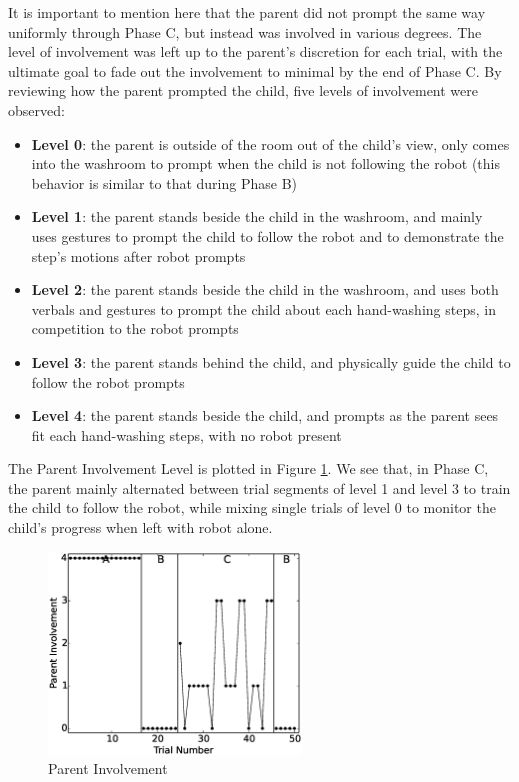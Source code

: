 \documentclass{ut-thesis}
\begin{document}
It is important to mention here that the parent did not prompt the same way uniformly through Phase C, but instead was involved in various degrees.  The level of involvement was left up to the parent's discretion for each trial, with the ultimate goal to fade out the involvement to minimal by the end of Phase C.  By reviewing how the parent prompted the child, five levels of involvement were observed:
\begin{itemize}
	\item \textbf{Level 0}: the parent is outside of the room out of the child's view, only comes into the washroom to prompt when the child is not following the robot (this behavior is similar to that during Phase B)
	\item \textbf{Level 1}: the parent stands beside the child in the washroom, and mainly uses gestures to prompt the child to follow the robot and to demonstrate the step's motions after robot prompts
	\item \textbf{Level 2}: the parent stands beside the child in the washroom, and uses both verbals and gestures to prompt the child about each hand-washing steps, in competition to the robot prompts
	\item \textbf{Level 3}: the parent stands behind the child, and physically guide the child to follow the robot prompts
	\item \textbf{Level 4}: the parent stands beside the child, and prompts as the parent sees fit each hand-washing steps, with no robot present
\end{itemize}
The Parent Involvement Level is plotted in Figure \ref{fig:107ParentInvolvement}.  We see that, in Phase C, the parent mainly alternated between trial segments of level 1 and level 3 to train the child to follow the robot, while mixing single trials of level 0 to monitor the child's progress when left with robot alone.
\begin{figure} [h]
	\centering
	\includegraphics[width=0.6\textwidth]{./img/data_analysis/107ParentInvolvement.eps}
	\caption{Parent Involvement}
	\label{fig:107ParentInvolvement}
\end{figure}
\end{document}
